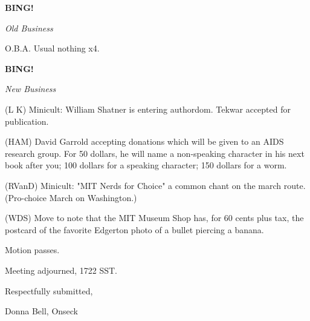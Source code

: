 \documentclass[12pt]{article}
\newcommand{\bing}{{\bf BING!} }
\newcommand{\goto}[1]{\bing \vskip 12pt \centerline{{\em{#1}}}}
\begin{document}
\goto{Old Business}

O.B.A. Usual nothing x4.

\goto{New Business}

(L K) Minicult: William Shatner is entering authordom. Tekwar accepted for publication.

(HAM) David Garrold accepting donations which will be given to an AIDS research group. For 50 dollars, he will name a non-speaking character in his next book after you; 100 dollars for a speaking character; 150 dollars for a worm.

(RVanD) Minicult: "MIT Nerds for Choice" a common chant on the march route. (Pro-choice March on Washington.)

(WDS) Move to note that the MIT Museum Shop has, for 60 cents plus tax, the postcard of the favorite Edgerton photo of a bullet piercing a banana.

Motion passes.

\vspace{12pt}

\noindent
Meeting adjourned, 1722 SST.

\vspace{18pt}

\centerline{Respectfully submitted,}
\centerline{Donna Bell, Onseck}
\end{document}
